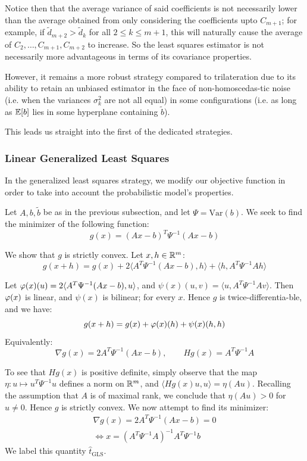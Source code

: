 Notice then that the average variance of said coefficients is not necessarily lower than the average obtained from only considering the coefficients upto $C_{m+1}$; for example, if $\widetilde d_{m+2} > \widetilde d_k$ for all $2 \leq k\leq m+1$, this will naturally cause the average of $C_2, \dots, C_{m+1}, C_{m+2}$ to increase. So the least squares estimator is not necessarily more advantageous in terms of its covariance properties.

However, it remains a more robust strategy compared to trilateration due to its ability to retain an unbiased estimator in the face of non-homoscedas-tic noise (i.e. when the variances $\sigma_k^2$ are not all equal) in some configurations (i.e. as long as $\mathbb E[b]$ lies in some hyperplane containing $\widetilde b$).

This leads us straight into the first of the dedicated strategies.

\subsubsection{Linear Generalized Least Squares}
In the generalized least squares strategy, we modify our objective function in order to take into account the probabilistic model's properties.

Let $A,b,\widetilde b$ be as in the previous subsection, and let $\Psi = \mathrm{Var}(b)$. We seek to find the minimizer of the following function:
\[
    g(x) = (Ax-b)^T\Psi^{-1}(Ax-b)
\]

We show that $g$ is strictly convex. Let $x,h\in\mathbb R^m$:
\[
    g(x+h) = g(x) + 2\langle A^T\Psi^{-1}(Ax-b), h\rangle + \langle h, A^T\Psi^{-1}Ah\rangle
\]

Let $\varphi(x)(u) = 2\langle A^T\Psi^{-1}(Ax-b), u\rangle$, and $\psi(x)(u,v) = \langle u, A^T\Psi^{-1}Av\rangle$. Then $\varphi(x)$ is linear, and $\psi(x)$ is bilinear; for every $x$. Hence $g$ is twice-differentia-ble, and we have:
\[
    g(x+h) = g(x) + \varphi(x)(h) + \psi(x)(h,h)
\]
Equivalently:
\[
    \nabla g(x) = 2A^T\Psi^{-1}(Ax-b), \qquad
    Hg(x) = A^T\Psi^{-1}A
\]

To see that $Hg(x)$ is positive definite, simply observe that the map $\eta:u\mapsto u^T\Psi^{-1}u$ defines a norm on $\mathbb R^m$, and $\langle Hg(x)u,u\rangle = \eta(Au)$. Recalling the assumption that $A$ is of maximal rank, we conclude that $\eta(Au)>0$ for $u\neq 0$. Hence $g$ is strictly convex. We now attempt to find its minimizer:
\begin{align*}
    \nabla g(x) = 2A^T\Psi^{-1}(Ax-b) = 0 \\
    \iff x = (A^T\Psi^{-1}A)^{-1}A^T\Psi^{-1}b
\end{align*}
We label this quantity $\hat t_\text{GLS}$.

